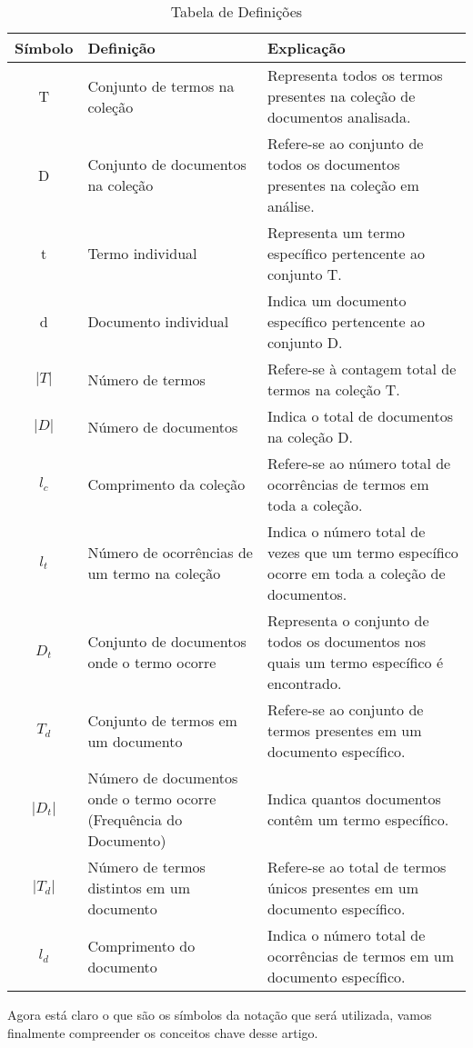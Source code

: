 \documentclass[12pt]{article}
\begin{document}
\begin{table}[H]
\centering
\begin{tabular}{|c|p{5cm}|p{6cm}|}
\hline
Símbolo & Definição & Explicação \\
\hline
T & Conjunto de termos na coleção & Representa todos os termos presentes na coleção de documentos analisada. \\
D & Conjunto de documentos na coleção & Refere-se ao conjunto de todos os documentos presentes na coleção em análise. \\
t & Termo individual & Representa um termo específico pertencente ao conjunto T. \\
d & Documento individual & Indica um documento específico pertencente ao conjunto D. \\
$\vert T \vert$ & Número de termos & Refere-se à contagem total de termos na coleção T. \\
$\vert D \vert$ & Número de documentos & Indica o total de documentos na coleção D. \\
$l_c$ & Comprimento da coleção & Refere-se ao número total de ocorrências de termos em toda a coleção. \\
$l_t$ & Número de ocorrências de um termo na coleção & Indica o número total de vezes que um termo específico ocorre em toda a coleção de documentos. \\
$D_t$ & Conjunto de documentos onde o termo ocorre & Representa o conjunto de todos os documentos nos quais um termo específico é encontrado. \\
$T_d$ & Conjunto de termos em um documento & Refere-se ao conjunto de termos presentes em um documento específico. \\
$\vert D_t \vert$ & Número de documentos onde o termo ocorre (Frequência do Documento) & Indica quantos documentos contêm um termo específico. \\
$\vert T_d \vert$ & Número de termos distintos em um documento & Refere-se ao total de termos únicos presentes em um documento específico. \\
$l_d$ & Comprimento do documento & Indica o número total de ocorrências de termos em um documento específico. \\
\hline
\end{tabular}
\caption{Tabela de Definições}
\label{tab:definicoes}
\end{table}

Agora está claro o que são os símbolos da notação que será utilizada, vamos finalmente compreender os conceitos chave desse artigo.
\end{document}
